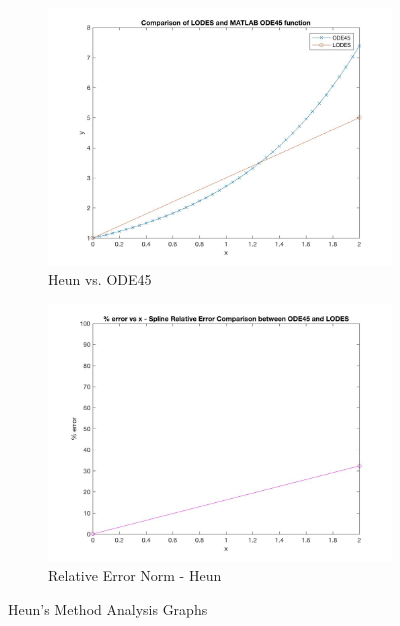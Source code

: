 \documentclass[12pt, titlepage]{article}
\begin{document}
\begin{figure}[H]
\centering
\begin{subfigure}{.55\textwidth}
  \centering
  \includegraphics[width=\linewidth]{images/Test1/3LODESvsMATLABPlot.jpg}
  \caption{Heun vs. ODE45}
  \label{fig:heun1a}
\end{subfigure}%
\begin{subfigure}{.55\textwidth}
  \centering
  \includegraphics[width=\linewidth]{images/Test1/3RelativeErrorPlot.jpg}
  \caption{Relative Error Norm - Heun}
  \label{fig:heun1b}
\end{subfigure}
\caption{Heun's Method Analysis Graphs}
\label{fig:heun1}
\end{figure}
\end{document}
